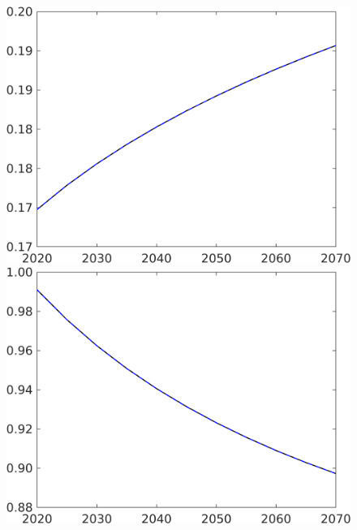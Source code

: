 \begin{figure}[h!!]
\begin{minipage}[]{0.32\textwidth}
\end{minipage}
\begin{minipage}[]{0.32\textwidth}
	\includegraphics[width=1\textwidth]{../../codding_model/own_basedOnFried/optimalPol_190722_tidiedUp/figures/all_10Aout22/CountTaul_modnsk_target_LgLf_spillover0_sep1_extern0_PV1_etaa0.79_lgd0.png}
\end{minipage}
	\begin{minipage}[]{0.32\textwidth}
		\includegraphics[width=1\textwidth]{../../codding_model/own_basedOnFried/optimalPol_190722_tidiedUp/figures/all_10Aout22/CountTaul_modnsk_target_S_spillover0_sep1_extern0_PV1_etaa0.79_lgd0.png}

\end{minipage}
\end{figure}
